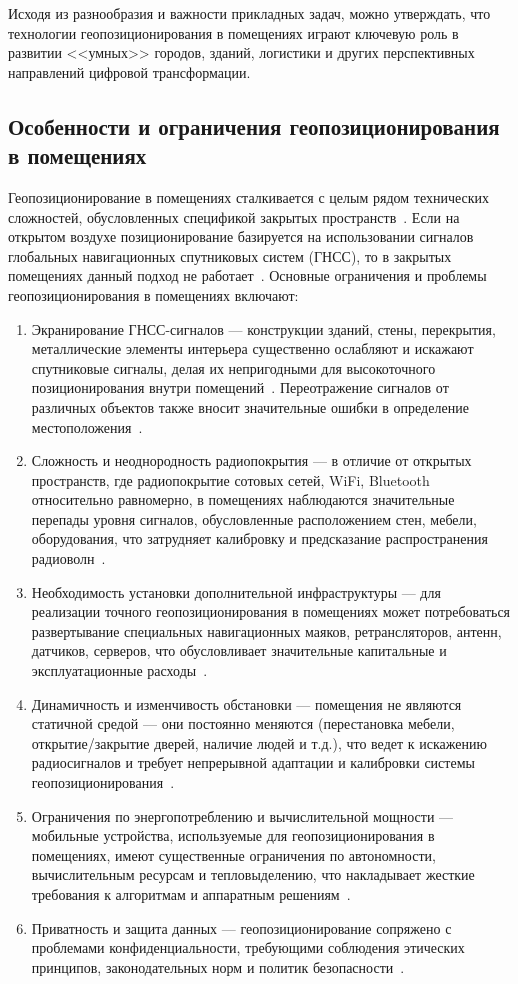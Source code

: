 Исходя из разнообразия и важности прикладных задач, можно утверждать, что технологии геопозиционирования в помещениях играют ключевую роль в развитии <<умных>> городов, зданий, логистики и других перспективных направлений цифровой трансформации.

\subsection{Особенности и ограничения геопозиционирования в помещениях}

Геопозиционирование в помещениях сталкивается с целым рядом технических сложностей, обусловленных спецификой закрытых пространств~\cite{basebook}. Если на открытом воздухе позиционирование базируется на использовании сигналов глобальных навигационных спутниковых систем (ГНСС), то в закрытых помещениях данный подход не работает~\cite{intro}. Основные ограничения и проблемы геопозиционирования в помещениях включают:

\begin{enumerate}
    \item Экранирование ГНСС-сигналов --- конструкции зданий, стены, перекрытия, металлические элементы интерьера существенно ослабляют и искажают спутниковые сигналы, делая их непригодными для высокоточного позиционирования внутри помещений~\cite{shielding}. Переотражение сигналов от различных объектов также вносит значительные ошибки в определение местоположения~\cite{shielding}.
    \item Сложность и неоднородность радиопокрытия --- в отличие от открытых пространств, где радиопокрытие сотовых сетей, WiFi, Bluetooth относительно равномерно, в помещениях наблюдаются значительные перепады уровня сигналов, обусловленные расположением стен, мебели, оборудования, что затрудняет калибровку и предсказание распространения радиоволн~\cite{heterogenity}.
    \item Необходимость установки дополнительной инфраструктуры --- для реализации точного геопозиционирования в помещениях может потребоваться развертывание специальных навигационных маяков, ретрансляторов, антенн, датчиков, серверов, что обусловливает значительные капитальные и эксплуатационные расходы~\cite{basebook}.
    \item Динамичность и изменчивость обстановки --- помещения не являются статичной средой --- они постоянно меняются (перестановка мебели, открытие/закрытие дверей, наличие людей и т.д.), что ведет к искажению радиосигналов и требует непрерывной адаптации и калибровки системы геопозиционирования~\cite{adaptation}.
    \item Ограничения по энергопотреблению и вычислительной мощности --- мобильные устройства, используемые для геопозиционирования в помещениях, имеют существенные ограничения по автономности, вычислительным ресурсам и тепловыделению, что накладывает жесткие требования к алгоритмам и аппаратным решениям~\cite{econsumption}.
    \item Приватность и защита данных --- геопозиционирование сопряжено с проблемами конфиденциальности, требующими соблюдения этических принципов, законодательных норм и политик безопасности~\cite{privacy}.
\end{enumerate}

